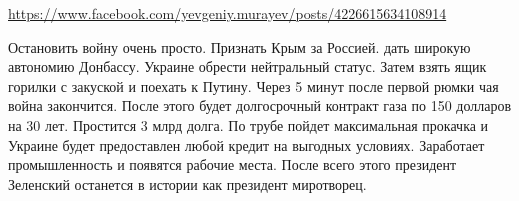  
 
 
 
 

\url{https://www.facebook.com/yevgeniy.murayev/posts/4226615634108914}

\begin{cmtfront}

Остановить войну очень просто. Признать Крым за Россией. дать широкую автономию
Донбассу. Украине обрести нейтральный статус. Затем взять ящик горилки с
закуской и поехать к Путину. Через 5 минут после первой рюмки чая война
закончится. После этого будет долгосрочный контракт газа по 150 долларов на 30
лет. Простится 3 млрд долга. По трубе пойдет максимальная прокачка и Украине
будет предоставлен любой кредит на выгодных условиях. Заработает промышленность
и появятся рабочие места. После всего этого президент Зеленский останется в
истории как президент миротворец.	

\end{cmtfront}
